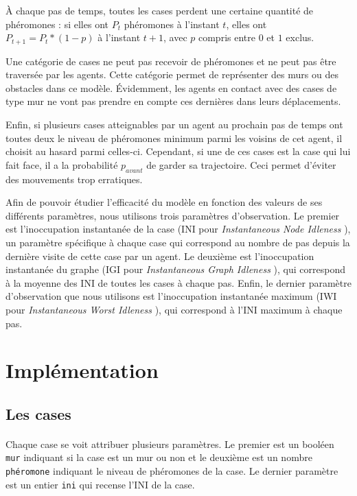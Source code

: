 \documentclass{article}
\begin{document}
    À chaque pas de temps, toutes les cases perdent une certaine quantité de phéromones : si elles ont $P_t$ phéromones
    à l'instant $t$, elles ont $P_{t+1} = P_t * (1-p)$ à l'instant $t+1$, avec $p$ compris entre $0$ et $1$ exclus.

    Une catégorie de cases ne peut pas recevoir de phéromones et ne peut pas être traversée par les agents. Cette catégorie permet
    de représenter des murs ou des obstacles dans ce modèle. Évidemment, les agents en contact avec des cases de type mur
    ne vont pas prendre en compte ces dernières dans leurs déplacements.

    Enfin, si plusieurs cases atteignables par un agent au prochain pas de temps ont toutes deux le niveau de phéromones minimum 
    parmi les voisins de cet agent, il choisit au hasard parmi celles-ci. Cependant, si une de ces cases est la case qui lui fait 
    face, il a la probabilité $p_{avant}$ de garder sa trajectoire. Ceci permet d'éviter des mouvements trop erratiques.

    Afin de pouvoir étudier l'efficacité du modèle en fonction des valeurs de ses différents paramètres, nous utilisons trois paramètres
    d'observation. Le premier est l'inoccupation instantanée de la case (INI pour \textit{Instantaneous  Node  Idleness }), un paramètre 
    spécifique à chaque case qui correspond au nombre de pas depuis la dernière visite de cette case par un agent. Le deuxième est 
    l'inoccupation instantanée du graphe (IGI pour \textit{Instantaneous  Graph  Idleness }), qui correspond à la moyenne des INI de toutes les
    cases à chaque pas. Enfin, le dernier paramètre d'observation que nous utilisons est l'inoccupation instantanée maximum (IWI pour 
    \textit{Instantaneous   Worst   Idleness }), qui correspond à l'INI maximum à chaque pas.

\section{Implémentation}
    \subsection{Les cases}

        \paragraph{}Chaque case se voit attribuer plusieurs paramètres.
Le premier est un booléen \texttt{mur} indiquant si la case est un mur ou non et le deuxième est un nombre \texttt{phéromone} indiquant le niveau de phéromones
        de la case. Le dernier paramètre est un entier \texttt{ini} qui recense l'INI de la case.
\end{document}

